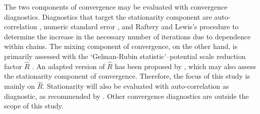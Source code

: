 \documentclass[article]{jss}
\begin{document}


The two components of convergence may be evaluated with convergence diagnostics. Diagnostics that target the stationarity component are auto-correlation \citep{scha97, gelm13}, numeric standard error \citep[which is commonly called `MC error']{gewe92}, and Raftery and Lewis's \citeyear{raft91} procedure to determine the increase in the necessary number of iterations due to dependence within chains. The mixing component of convergence, on the other hand, is primarily assessed with the `Gelman-Rubin statistic'--potential scale reduction factor $\widehat{R}$ \citep{gelm92}. An adapted version of $\widehat{R}$ has been proposed by \cite{veht19}, which may also assess the stationarity component of convergence. Therefore, the focus of this study is mainly on $\widehat{R}$. Stationarity will also be evaluated with auto-correlation as diagnostic, as recommended by \cite[p.~898]{cowl96}. Other convergence diagnostics are outside the scope of this study. \footnotemark 
{}%
\end{document}
